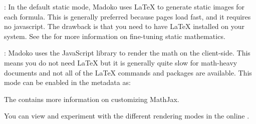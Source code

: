 \documentclass{book}
\begin{document}
\begin{mdUl}[class={list-star,loose},data-line={1297}]%
\begin{mdLi}[data-line={1297}]%
\begin{mdP}[data-line={1297}]%
{}%
{}: In the default static mode, Madoko uses LaTeX to generate static images 
  for each formula. This is generally preferred because pages load fast, 
  and it requires no javascript. The drawback is that you
  need to have LaTeX installed on your system. See the 
{}{\mdNbsp}%
{}
  for more information on fine-tuning static mathematics.%
\end{mdP}%
\end{mdLi}%
\begin{mdLi}[data-line={1304}]%
\begin{mdP}[data-line={1304}]%
{}%
{}:  Madoko uses the%
{}{\mdNbsp}%
{} JavaScript
  library to render the math on the client-side. This means you do not
  need LaTeX but it is generally quite slow for math-heavy documents and
  not all of the LaTeX commands and packages are available. This mode can be
  enabled in the metadata as:%
\end{mdP}%
\begin{mdPre}[class={para-block,pre-fenced},data-line={1309},data-line-code={1310}]%
%
\end{mdPre}%
\begin{mdP}[data-line={1312}]%
{}  The%
{}{\mdNbsp}%
{} contains more information on customizing MathJax.%
\end{mdP}%
\end{mdLi}%
\end{mdUl}%
\begin{mdP}[data-line={1314}]%
{}You can view and experiment with the different rendering modes in the online
{}%
{}.%
\end{mdP}%
\end{document}
